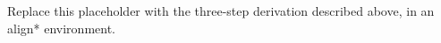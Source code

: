 \documentclass{article}
\begin{document}
Replace this placeholder with the three-step derivation described
above, in an align* environment.
\end{document}
